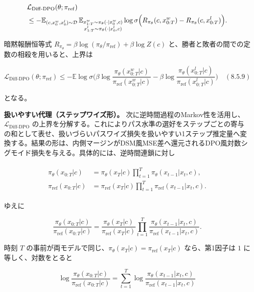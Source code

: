 \begin{align*}
\begin{aligned}
&\mathcal{L}_{\mathrm{Diff\text{-}DPO}}(\theta;\pi_{\mathrm{ref}}) \\
&\le-\mathbb{E}_{(c,x_0^w,x_0^l)\sim\mathcal{D}}\,
\mathbb{E}_{\substack{x_{1:T}^w\sim\pi_\theta(\cdot|x_0^w,c)\\x_{1:T}^l\sim\pi_\theta(\cdot|x_0^l,c)}}
\log\sigma\Bigl(R_{\pi_\theta}(c,x_{0:T}^w)-R_{\pi_\theta}(c,x_{0:T}^l)\Bigr).
\end{aligned}
\end{align*}


暗黙報酬恒等式 $R_{\pi_\theta}=\beta\log(\pi_\theta/\pi_{\mathrm{ref}})+\beta\log Z(c)$ と、勝者と敗者の間での定数の相殺を用いると、上界は

\[
\mathcal{L}_{\mathrm{Diff\text{-}DPO}}(\theta;\pi_{\mathrm{ref}})
\le-\mathbb{E}\log\sigma\Biggl(
\beta\log\frac{\pi_\theta(x_{0:T}^w|c)}{\pi_{\mathrm{ref}}(x_{0:T}^w|c)}
-\beta\log\frac{\pi_\theta(x_{0:T}^l|c)}{\pi_{\mathrm{ref}}(x_{0:T}^l|c)}
\Biggr) \quad (8.5.9)
\]


となる。

\textbf{扱いやすい代理（ステップワイズ形）。} 次に逆時間過程のMarkov性を活用し、$\mathcal{L}_{\mathrm{Diff\text{-}DPO}}$ の上界を分解する。これによりパス水準の選好をステップごとの寄与の和として表せ、扱いづらいパスワイズ損失を扱いやすい1ステップ推定量へ変換する。結果の形は、内側マージンがDSM風MSE差へ還元されるDPO風対数シグモイド損失を与える。具体的には、逆時間連鎖に対し

\begin{align*}
\begin{aligned}
\pi_\theta(x_{0:T}|c)&=\pi_\theta(x_T|c)\prod_{t=1}^T\pi_\theta(x_{t-1}|x_t,c), \\
\pi_{\mathrm{ref}}(x_{0:T}|c)&=\pi_{\mathrm{ref}}(x_T|c)\prod_{t=1}^T\pi_{\mathrm{ref}}(x_{t-1}|x_t,c).
\end{aligned}
\end{align*}


ゆえに

\[
\frac{\pi_\theta(x_{0:T}|c)}{\pi_{\mathrm{ref}}(x_{0:T}|c)}
=\frac{\pi_\theta(x_T|c)}{\pi_{\mathrm{ref}}(x_T|c)}\prod_{t=1}^T\frac{\pi_\theta(x_{t-1}|x_t,c)}{\pi_{\mathrm{ref}}(x_{t-1}|x_t,c)}.
\]


時刻 $T$ の事前が両モデルで同じ、$\pi_\theta(x_T|c)=\pi_{\mathrm{ref}}(x_T|c)$ なら、第1因子は $1$ に等しく、対数をとると

\[
\log\frac{\pi_\theta(x_{0:T}|c)}{\pi_{\mathrm{ref}}(x_{0:T}|c)}
=\sum_{t=1}^T\log\frac{\pi_\theta(x_{t-1}|x_t,c)}{\pi_{\mathrm{ref}}(x_{t-1}|x_t,c)}
\]


